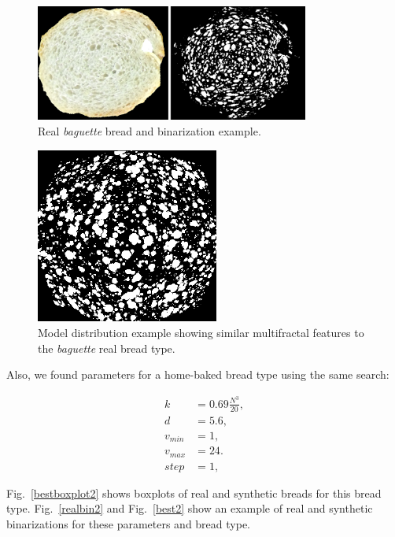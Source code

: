 \begin{figure}[!ht]
\begin{center}
\includegraphics[width=9cm]{figures/realbin}
\caption{ Real {\em baguette} bread and binarization example.}
\label{realbin}
\end{center}
\end{figure}

\begin{figure}[!ht]
\begin{center}
\includegraphics[width=6cm]{figures/best}
\caption{Model distribution example showing similar multifractal features to the {\em baguette} real bread type.}
\label{best}
\end{center}
\end{figure}

Also, we found parameters for a home-baked bread type using the same search:

\begin{align*}
k &= 0.69 \frac{N^{3}}{20} ,\\
d &=5.6,\\
v_{min} &=1,\\
v_{max} &=24.\\
step &=1,
\end{align*}

Fig.~\ref{bestboxplot2} shows boxplots of real and synthetic breads for this bread type. Fig.~\ref{realbin2} and  Fig.~\ref{best2} show an example of real and synthetic binarizations for these parameters and bread type. 


